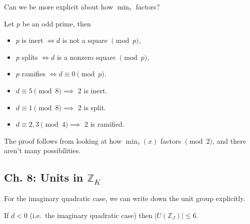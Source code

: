 \begin{question}

Can we be more explicit about how \(\min_\tau\) factors?

\end{question}

\begin{proposition}[?]

Let \(p\) be an odd prime, then

\begin{itemize}
\tightlist
\item
  \(p\) is inert \(\iff d\) is not a square \(\pmod p\),
\item
  \(p\) splits \(\iff d\) is a nonzero square \(\pmod p\),
\item
  \(p\) ramifies \(\iff d \equiv 0 \pmod p\).
\end{itemize}

\end{proposition}

\begin{proposition}[?]

\envlist

\begin{itemize}
\tightlist
\item
  \(d \equiv 5 \pmod 8 \implies\) 2 is inert.
\item
  \(d \equiv 1 \pmod 8 \implies\) 2 is split.
\item
  \(d \equiv 2, 3 \pmod 4 \implies\) 2 is ramified.
\end{itemize}

\end{proposition}

\begin{remark}

The proof follows from looking at how \(\min_\tau(x)\) factors
\(\pmod 2\), and there aren't many possibilities.

\end{remark}

\hypertarget{ch.-8-units-in-mathbbz_k}{%
\subsection{\texorpdfstring{Ch. 8: Units in
\({\mathbb{Z}}_K\)}{Ch. 8: Units in \{\textbackslash mathbb\{Z\}\}\_K}}\label{ch.-8-units-in-mathbbz_k}}

For the imaginary quadratic case, we can write down the unit group
explicitly.

\begin{proposition}[?]

If \(d<0\) (i.e.~the imaginary quadratic case) then
\({\left\lvert { U({\mathbb{Z}}_J)} \right\rvert} \leq 6\).

\end{proposition}

